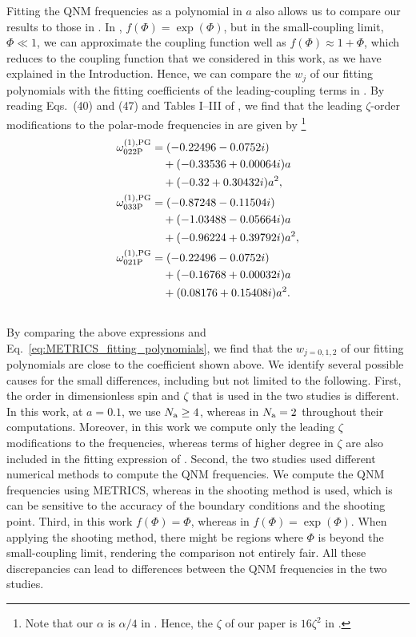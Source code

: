 \documentclass[aps,prx,amsmath,floats,floatfix,twocolumn,
  superscriptaddress,nofootinbib,showpacs]{revtex4-1}
\begin{document}
Fitting the QNM frequencies as a polynomial in $a$ also allows us to compare our results to those in \cite{Pierini:2022eim}. 
In \cite{Pierini:2022eim}, $f(\Phi) = \exp(\Phi)$, but in the small-coupling limit, $\Phi \ll 1 $, we can  approximate the coupling function well as $f(\Phi) \approx 1 + \Phi $, which reduces to the coupling function that we considered in this work, as we have explained in the Introduction. 
Hence, we can compare the $w_j$ of our fitting polynomials with the fitting coefficients of the leading-coupling terms in \cite{Pierini:2022eim}. 
By reading Eqs.~(40) and (47) and Tables I--III of \cite{Pierini:2022eim}, we find that the leading $\zeta$-order modifications to the polar-mode frequencies in \cite{Pierini:2022eim} are given by \footnote{Note that our $\alpha$ is $\alpha/4$ in \cite{Pierini:2022eim}. 
Hence, the $\zeta$ of our paper is $16 \zeta^2 $ in \cite{Pierini:2022eim}. }
\begin{align}
\omega^{(1), \rm PG}_{022\rm P} & = (-0.22496 -0.0752i) \nonumber \\
& \quad + (-0.33536+0.00064i)a \nonumber \\
& \quad + (-0.32+0.30432i)a^2, \nonumber \\
\label{eq:freq_Gultierai}
\omega^{(1), \rm PG}_{033\rm P} & = (-0.87248 -0.11504i) \nonumber \\
& \quad + (-1.03488-0.05664i)a \\
& \quad + (-0.96224+0.39792i)a^2, \nonumber \\
\omega^{(1), \rm PG}_{021\rm P} & = (-0.22496 -0.0752i) \nonumber \\
& \quad + (-0.16768+0.00032i)a \nonumber \\
& \quad + (0.08176+0.15408i)a^2. \nonumber \\
\nonumber 
\end{align}
By comparing the above expressions and Eq.~\eqref{eq:METRICS_fitting_polynomials}, 
we find that the $w_{j=0,1,2}$ of our fitting polynomials are close to the coefficient shown above. 
We identify several possible causes for the small differences, including but not limited to the following.  
First, the order in dimensionless spin and $\zeta$ that is used in the two studies is different. 
In this work, at $a=0.1$, we use $N_{\rm a} \geq 4$, whereas in \cite{Pierini:2022eim} $N_{\rm a} = 2$ throughout their computations. Moreover, in this work we compute only the leading $\zeta$ modifications to the frequencies, whereas terms of higher degree in $\zeta$ are also included in the fitting expression of \cite{Pierini:2022eim}. 
Second, the two studies used different numerical methods to compute the QNM frequencies. 
We compute the QNM frequencies using METRICS, whereas in \cite{Pierini:2022eim} the shooting method is used, which is can be sensitive to the accuracy of the boundary conditions and the shooting point. 
Third, in this work $f(\Phi) = \Phi$, whereas in \cite{Pierini:2022eim} $f(\Phi) = \exp(\Phi)$. 
When applying the shooting method, there might be regions where $\Phi$ is beyond the small-coupling limit, rendering the comparison not entirely fair. 
All these discrepancies can lead to differences between the QNM frequencies in the two studies.  
\end{document}
